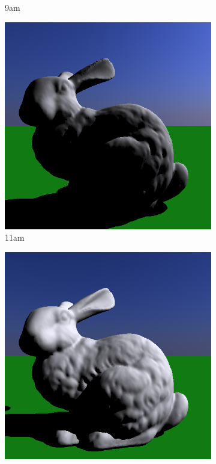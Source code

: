 \begin{figure}[h]
\begin{subfigure}[b]{0.3\textwidth}
		\caption{9am}
		\label{fig:skylight9}
	\end{subfigure}
	\begin{subfigure}[b]{0.3\textwidth}
		\includegraphics[width=\textwidth]{week2/2/bunny_11.png}
		\caption{11am}
		\label{fig:skylight11}
	\end{subfigure}
	\begin{subfigure}[b]{0.3\textwidth}
		\includegraphics[width=\textwidth]{week2/2/bunny_13.png}

\end{subfigure}
\end{figure}
